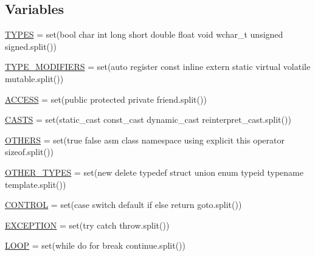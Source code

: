 \subsection*{Variables}
\begin{DoxyCompactItemize}
\item 
\mbox{\hyperlink{namespacecpp_1_1keywords_a56fd5baf357970548e1ec366edfc2c13}{T\+Y\+P\+ES}} = set(\textquotesingle{}bool char int long short double float void wchar\+\_\+t unsigned signed\textquotesingle{}.split())
\item 
\mbox{\hyperlink{namespacecpp_1_1keywords_af9282ce418d6b4b43dca5ed574caedd7}{T\+Y\+P\+E\+\_\+\+M\+O\+D\+I\+F\+I\+E\+RS}} = set(\textquotesingle{}auto register const inline extern static virtual volatile mutable\textquotesingle{}.split())
\item 
\mbox{\hyperlink{namespacecpp_1_1keywords_a786f41bbea982641425c819d10bb2064}{A\+C\+C\+E\+SS}} = set(\textquotesingle{}public protected private friend\textquotesingle{}.split())
\item 
\mbox{\hyperlink{namespacecpp_1_1keywords_aeba38dc38e188040f4ec44ba05092e7f}{C\+A\+S\+TS}} = set(\textquotesingle{}static\+\_\+cast const\+\_\+cast dynamic\+\_\+cast reinterpret\+\_\+cast\textquotesingle{}.split())
\item 
\mbox{\hyperlink{namespacecpp_1_1keywords_a15fe231fbad145538b73892804898809}{O\+T\+H\+E\+RS}} = set(\textquotesingle{}true false asm class namespace using explicit this operator sizeof\textquotesingle{}.split())
\item 
\mbox{\hyperlink{namespacecpp_1_1keywords_aa86a5e35a3ace14022a5ca1b91baf207}{O\+T\+H\+E\+R\+\_\+\+T\+Y\+P\+ES}} = set(\textquotesingle{}new delete typedef struct union enum typeid typename template\textquotesingle{}.split())
\item 
\mbox{\hyperlink{namespacecpp_1_1keywords_a374dfe9c96681079802ba4724287b8ff}{C\+O\+N\+T\+R\+OL}} = set(\textquotesingle{}case switch default if else return goto\textquotesingle{}.split())
\item 
\mbox{\hyperlink{namespacecpp_1_1keywords_a2665fb8a25a4dae03fa5d3dc975c537c}{E\+X\+C\+E\+P\+T\+I\+ON}} = set(\textquotesingle{}try catch throw\textquotesingle{}.split())
\item 
\mbox{\hyperlink{namespacecpp_1_1keywords_af0164c05398a2291487b76414102d555}{L\+O\+OP}} = set(\textquotesingle{}while do for break continue\textquotesingle{}.split())
\item 

\end{DoxyCompactItemize}

